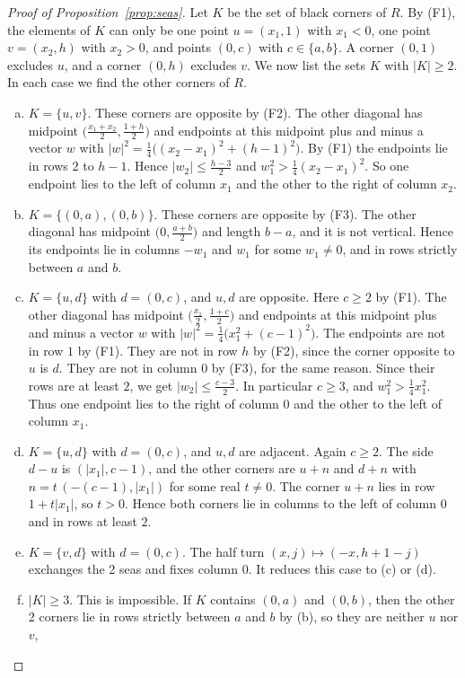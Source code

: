\begin{proof}[Proof of Proposition~\ref{prop:seas}]
Let $K$ be the set of black corners of $R$. By (F1), the elements of $K$ can only be one
point $u=(x_1,1)$ with $x_1<0$, one point $v=(x_2,h)$ with $x_2>0$, and points $(0,c)$ with
$c\in\{a,b\}$. A corner $(0,1)$ excludes $u$, and a corner $(0,h)$ excludes $v$. We now
list the sets $K$ with $|K|\ge2$. In each case we find the other corners of $R$.
\begin{enumerate}[(a)]
\item $K=\{u,v\}$. These corners are opposite by (F2). The other diagonal has midpoint
$\bigl(\frac{x_1+x_2}2,\frac{1+h}2\bigr)$ and endpoints at this midpoint plus and minus a
vector $w$ with $|w|^2=\frac14\bigl((x_2-x_1)^2+(h-1)^2\bigr)$. By (F1) the endpoints lie in
rows $2$ to $h-1$. Hence $|w_2|\le\frac{h-3}2$ and $w_1^2>\frac14(x_2-x_1)^2$. So one
endpoint lies to the left of column $x_1$ and the other to the right of column $x_2$.
\item $K=\{(0,a),(0,b)\}$. These corners are opposite by (F3). The other diagonal has
midpoint $\bigl(0,\frac{a+b}2\bigr)$ and length $b-a$, and it is not vertical. Hence its
endpoints lie in columns $-w_1$ and $w_1$ for some $w_1\ne0$, and in rows strictly between
$a$ and $b$.
\item $K=\{u,d\}$ with $d=(0,c)$, and $u,d$ are opposite. Here $c\ge2$ by (F1). The other
diagonal has midpoint $\bigl(\frac{x_1}2,\frac{1+c}2\bigr)$ and endpoints at this midpoint
plus and minus a vector $w$ with $|w|^2=\frac14\bigl(x_1^2+(c-1)^2\bigr)$. The endpoints
are not in row $1$ by (F1). They are not in row $h$ by (F2), since the corner opposite to
$u$ is $d$. They are not in column $0$ by (F3), for the same reason. Since their rows are
at least $2$, we get $|w_2|\le\frac{c-3}2$. In particular $c\ge3$, and
$w_1^2>\frac14x_1^2$. Thus one endpoint
lies to the right of column $0$ and the other to the left of column $x_1$.
\item $K=\{u,d\}$ with $d=(0,c)$, and $u,d$ are adjacent. Again $c\ge2$. The side $d-u$ is
$(|x_1|,c-1)$, and the other corners are $u+n$ and $d+n$ with $n=t\,(-(c-1),|x_1|)$ for
some real $t\ne0$. The corner $u+n$ lies in row $1+t|x_1|$, so $t>0$. Hence both corners lie in
columns to the left of column $0$ and in rows at least $2$.
\item $K=\{v,d\}$ with $d=(0,c)$. The half turn $(x,j)\mapsto(-x,h+1-j)$ exchanges the 2
seas and fixes column $0$. It reduces this case to (c) or (d).
\item $|K|\ge3$. This is impossible. If $K$ contains $(0,a)$ and $(0,b)$, then the other 2
corners lie in rows strictly between $a$ and $b$ by (b), so they are neither $u$ nor $v$,

\end{enumerate}
\end{proof}
